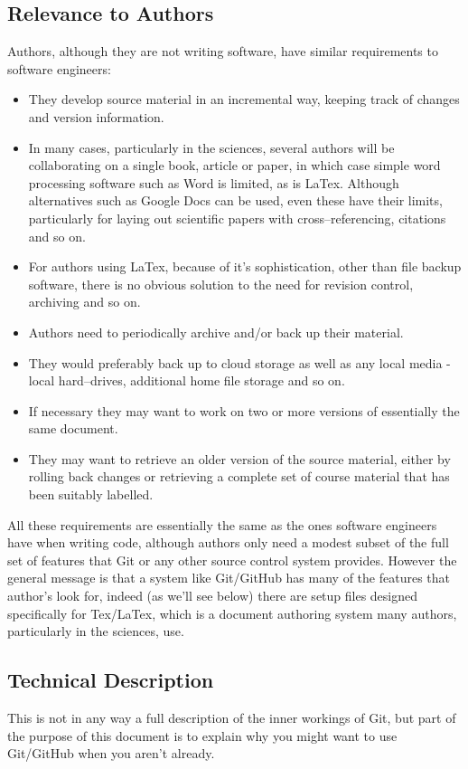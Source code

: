 \documentclass[a4paper, 12pt]{article}
\begin{document}
\subsection{Relevance to Authors}
Authors, although they are not writing software, have similar requirements to software engineers:
\begin{itemize}
\item They develop source material in an incremental way, keeping track of changes and version information.
\item In many cases, particularly in the sciences, several authors will be collaborating on a single book, article or paper, in which case simple word processing software such as Word is limited, as is LaTex. Although alternatives such as Google Docs can be used, even these have their limits, particularly for laying out scientific papers with cross--referencing, citations and so on.
\item For authors using LaTex, because of it's sophistication, other than file backup software, there is no obvious solution to the need for revision control, archiving and so on.
\item Authors need to periodically archive and/or back up their material.
\item They would preferably back up to cloud storage as well as any local media - local hard--drives, additional home file storage and so on.
\item If necessary they may want to work on two or more versions of essentially the same document.
\item They may want to retrieve an older version of the source material, either by rolling back changes or retrieving a complete set of course material that has been suitably labelled.
\end{itemize}
All these requirements are essentially the same as the ones software engineers have when writing code, although authors only need a modest subset of the full set of features that Git or any other source control system provides. However the general message is that a system like Git/GitHub has many of the features that author's look for, indeed (as we'll see below) there are setup files designed specifically for Tex/LaTex, which is a document authoring system many authors, particularly in the sciences, use.

\subsection{Technical Description}
This is not in any way a full description of the inner workings of Git, but part of the purpose of this document is to explain why you might want to use Git/GitHub when you aren't already.
\end{document}
